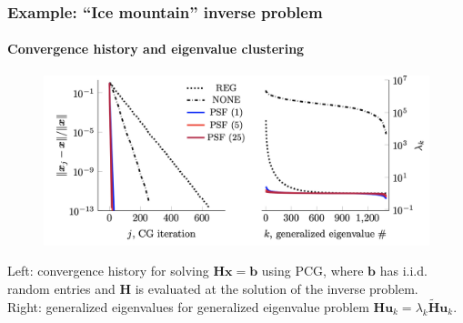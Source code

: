 \documentclass[10pt,final,xcolor=dvipsnames,aspect ratio=169]{beamer}
\newcommand{\preconditioner}{\widetilde{H}}
\begin{document}
\begin{frame}
	\frametitle{Example: ``Ice mountain'' inverse problem}
	\framesubtitle{Convergence history and eigenvalue clustering}
	
	\begin{figure}
		\begin{center}
			\includegraphics[width=0.75\columnwidth]{extraplots/bbb}
		\end{center}
	\end{figure}
		Left: convergence history for solving $\mathbf{H} \mathbf{x} = \mathbf{b}$
		using PCG, where $\mathbf{b}$ has i.i.d. random entries and $\mathbf{H}$ is evaluated at the
		solution of the inverse problem. \\ Right: generalized eigenvalues
		for generalized eigenvalue problem $\mathbf{H} \mathbf{u}_{k}=\lambda_{k}
		\mathbf{\preconditioner} \mathbf{u}_{k}$.
\end{frame}
\end{document}
